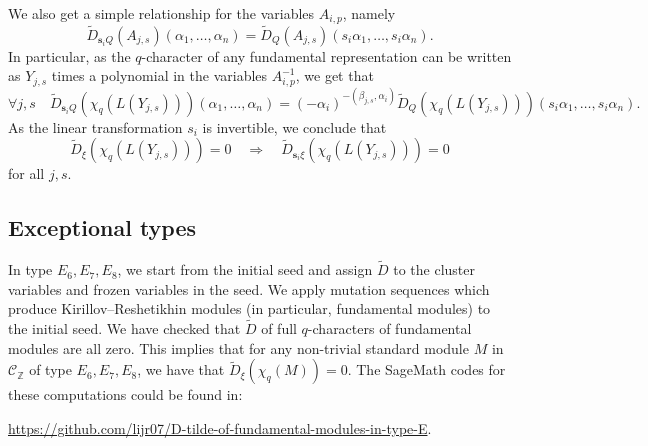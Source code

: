 \documentclass[12pt]{amsart}
\theoremstyle{plain}
\theoremstyle{definition}
\numberwithin{equation}{section}
\newcommand{\td}{{\widetilde{D}}}
\newcommand{\tdxi}{\widetilde{D}_{\xi}}
\newcommand{\CZ}{\mathcal{C}_{\mathbb{Z}}}
\begin{document}
 We also get a simple relationship for the variables $A_{i,p}$, namely
  $$ \td_{\mathbf{s}_i Q}(A_{j,s})(\alpha_1, \ldots , \alpha_n) =  \td_{Q}(A_{j,s})(s_i \alpha_1, \ldots, s_i \alpha_n) . $$
 In particular, as the $q$-character of any fundamental representation can be written as $Y_{j,s}$ times a polynomial in the variables $A_{i,p}^{-1}$, we get that 
 $$ \forall j,s \quad  \td_{\mathbf{s}_i Q}(\chi_q(L(Y_{j,s})))(\alpha_1, \ldots , \alpha_n) = (-\alpha_i)^{-(\beta_{j,s},\alpha_i)} \td_{Q}(\chi_q(L(Y_{j,s})))(s_i \alpha_1, \ldots, s_i \alpha_n). $$
 As the linear transformation $s_i$ is invertible,  we conclude that 
 $$  \td_{\xi}(\chi_q(L(Y_{j,s})))=0 \quad   \Rightarrow \quad  \td_{\mathbf{s}_i \xi}(\chi_q(L(Y_{j,s})))=0   $$
 for all $j,s$.


\subsection{Exceptional types}

In type $E_6, E_7, E_8$, we start from the initial seed and assign $\td$ to the cluster variables and frozen variables in the seed. We apply mutation sequences which produce Kirillov--Reshetikhin modules (in particular, fundamental modules) to the initial seed. We have checked that $\td$ of full $q$-characters of fundamental modules are all zero. This implies that for any non-trivial standard module $M$ in $\CZ$ of type $E_6, E_7, E_8$, we have that $\tdxi \left( \chi_q(M) \right) = 0$. The SageMath codes for these computations could be found in: 

\url{https://github.com/lijr07/D-tilde-of-fundamental-modules-in-type-E}. 


\end{document}
